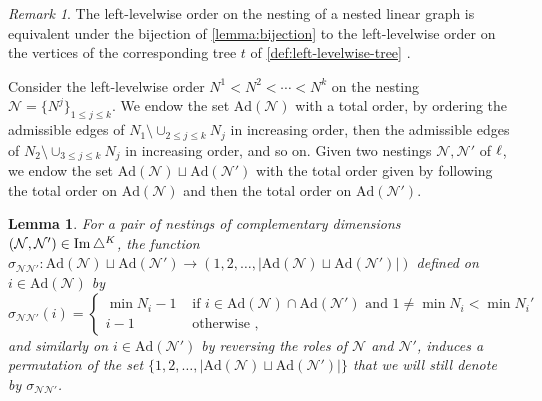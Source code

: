 \documentclass[twoside, 12pt]{amsart}
\newtheorem{lemma}[definition]{Lemma}
\theoremstyle{remark}
\newtheorem{remark}[definition]{\sc Remark}
\begin{document}
\begin{remark}
The left-levelwise order on the nesting of a nested linear graph is equivalent under the bijection of \cref{lemma:bijection} to the left-levelwise order on the vertices of the corresponding tree $t$ of \cref{def:left-levelwise-tree} .
\end{remark}

Consider the left-levelwise order $N^1<N^2<\cdots < N^k$ on the nesting $\mathcal{N}=\{N^j\}_{1\leq j \leq k}$.
We endow the set $\mathrm{Ad}(\mathcal{N})$ with a total order, by ordering the admissible edges of $N_1 \setminus \cup_{2\leq j \leq k} N_j$ in increasing order, then the admissible edges of $N_2 \setminus \cup_{3\leq j \leq k} N_j$ in increasing order, and so on. Given two nestings $\mathcal{N}, \mathcal{N}'$ of $\ell$, we endow the set $\mathrm{Ad}(\mathcal{N})\sqcup \mathrm{Ad}(\mathcal{N}')$ with the total order given by following the total order on $\mathrm{Ad}(\mathcal{N})$ and then the total order on $\mathrm{Ad}(\mathcal{N}')$. 

\begin{lemma} 
\label{prop:signs-ass}
For a pair of nestings of complementary dimensions $(\mathcal{N}, \mathcal{N}')\in \operatorname{Im}\triangle^K$, the function $\sigma_{\mathcal{N}\mathcal{N}'}: \mathrm{Ad}(\mathcal{N})\sqcup \mathrm{Ad}(\mathcal{N}') \to (1,2,\ldots,|\mathrm{Ad}(\mathcal{N})\sqcup \mathrm{Ad}(\mathcal{N}')|)$ defined on $i \in \mathrm{Ad}(\mathcal{N})$ by 
\begin{equation*}
  \sigma_{\mathcal{N}\mathcal{N}'}(i)= 
  \begin{cases}
    \min N_i -1 & \text{ if } i \in \mathrm{Ad}(\mathcal{N})\cap \mathrm{Ad}(\mathcal{N}') \text{ and } 1 \neq \min N_i < \min N_i' \\ 
    i-1 & \text{ otherwise ,} 
  \end{cases}
\end{equation*}
and similarly on $i \in \mathrm{Ad}(\mathcal{N}')$ by reversing the roles of $\mathcal{N}$ and $\mathcal{N}'$, induces a permutation of the set $\{1,2,\ldots,|\mathrm{Ad}(\mathcal{N})\sqcup \mathrm{Ad}(\mathcal{N}')|\}$ that we will still denote by $\sigma_{\mathcal{N}\mathcal{N}'}$.
\end{lemma}
\end{document}
